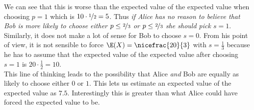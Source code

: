 \documentclass{article}
\begin{document}
We can see that this is worse than the expected value of the
expected value when choosing $p=1$ which is $10\cdot\nicefrac{1}{2}=5$.
Thus \emph{if Alice has no reason to believe that Bob is more likely
	to choose either $p\leq\nicefrac{2}{3}$ or $p\leq\nicefrac{2}{3}$
	she should pick $s=1$}.\\
Similarly, it does not make a lot of sense for Bob to choose $s=0$.
From his point of view, it is not sensible to force
$\E(X)=\nicefrac{20}{3}$ with $s=\frac{1}{3}$ because he has to
assume that the expected value of the expected value
after choosing $s=1$ is $20\cdot \frac{1}{2}=10$.\\
This line of thinking leads to the possibility that Alice \emph{and}
Bob are equally as likely to choose either $0$ or $1$. This lets us
estimate an expected value of the expected value as $7.5$. Interestingly
this is greater than what Alice could have forced the expected value to
be.
\end{document}
